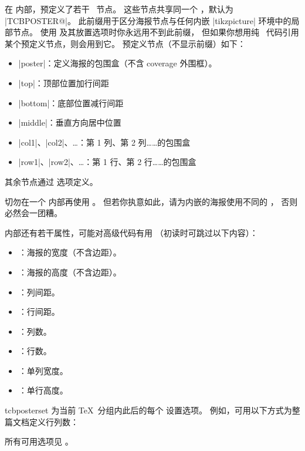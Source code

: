 \clearpage
  在  内部，预定义了若干 \tikzname\ 节点。
  这些节点共享同一个 ，默认为 |TCBPOSTER@|。
  此前缀用于区分海报节点与任何内嵌 |tikzpicture| 环境中的局部节点。
  使用  及其放置选项时你永远用不到此前缀，
  但如果你想用纯 \tikzname\ 代码引用某个预定义节点，则会用到它。
  预定义节点（不显示前缀）如下：
  \begin{itemize}
  \item|poster|：定义海报的包围盒（不含 coverage 外围框）。
  \item|top|：顶部位置加行间距
  \item|bottom|：底部位置减行间距
  \item|middle|：垂直方向居中位置
  \item|col1|、|col2|、\ldots：第 1 列、第 2 列……的包围盒
  \item|row1|、|row2|、\ldots：第 1 行、第 2 行……的包围盒
  \end{itemize}
  其余节点通过  选项定义。

  \begin{marker}
  切勿在一个  内部再使用 。
  但若你执意如此，请为内嵌的海报使用不同的 ，
  否则必然会一团糟。
  \end{marker}

   内部还有若干属性，可能对高级代码有用
  （初读时可跳过以下内容）：
  \begin{itemize}
  \item{}：海报的宽度（不含边距）。
  \item{}：海报的高度（不含边距）。
  \item{}：列间距。
  \item{}：行间距。
  \item{}：列数。
  \item{}：行数。
  \item{}：单列宽度。
  \item{}：单行高度。
  \end{itemize}

\medskip
\begin{docCommand}[doc new=2017-07-03]{tcbposterset}{}
  为当前 \TeX\ 分组内此后的每个  设置选项。
  例如，可用以下方式为整篇文档定义行列数：
\begin{dispListing}
\end{dispListing}
  所有可用选项见 。
\end{docCommand}


